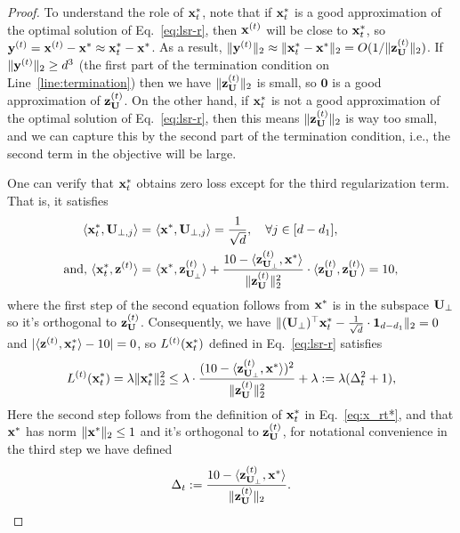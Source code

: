 \begin{proof}
To understand the role of $\mathbf{x}_t^{*}$, note that if $\mathbf{x}^{*}_{t}$ is a good approximation of the optimal solution of Eq.~\eqref{eq:lsr-r}, then $\mathbf{x}^{{(t)}}$ will be close to $\mathbf{x}^{*}_{t}$, so $\mathbf{y}^{(t)} = \mathbf{x}^{{(t)}} - \mathbf{x}^{*} \approx \mathbf{x}^{*}_{t} - \mathbf{x}^{*}$. As a result, $\|\mathbf{y}^{(t)}\|_2 \approx \|\mathbf{x}^{*}_{t} - \mathbf{x}^{*}\|_2 = O(1/\|\mathbf{z}_{\mathbf{U}}^{(t)}\|_2)$. If $\|\mathbf{y}^{(t)}\|_2 \geq d^3$ (the first part of the termination condition on Line~\ref{line:termination}) then we have $\|\mathbf{z}_{\mathbf{U}}^{(t)}\|_2$ is small, so $\mathbf{0}$ is a good approximation of $\mathbf{z}^{{(t)}}_{\mathbf{U}}$. 
On the other hand, if $\mathbf{x}^{*}_{t}$ is not a good approximation of the optimal solution of Eq.~\eqref{eq:lsr-r}, then this means $\|\mathbf{z}_{\mathbf{U}}^{(t)}\|_2$ is way too small, and we can capture this by the second part of the termination condition, i.e., the second term in the objective will be large.

One can verify that $\mathbf{x}^{*}_{t}$ obtains zero loss except for the third regularization term. That is, it satisfies 
\begin{align*}
\langle \mathbf{x}^{*}_{t}, \mathbf{U}_{\perp, j}\rangle = &~ \langle \mathbf{x}^{*}, \mathbf{U}_{\perp,j}\rangle = \frac{1}{\sqrt{d}}, \quad \forall j \in [d-d_1], \\
\text{and, } \langle \mathbf{x}^{*}_{t}, \mathbf{z}^{(t)}\rangle = &~\langle \mathbf{x}^{*}, \mathbf{z}_{\mathbf{U}_\perp}^{(t)} \rangle + \frac{10 - \langle \mathbf{z}_{\mathbf{U}_\perp}^{(t)},\mathbf{x}^{*}\rangle}{\|\mathbf{z}_{\mathbf{U}}^{(t)}\|_2^2}\cdot \langle \mathbf{z}_{\mathbf{U}}^{(t)}, \mathbf{z}_{\mathbf{U}}^{(t)}\rangle = 10,
\end{align*}
where the first step of the second equation follows from $\mathbf{x}^*$ is in the subspace $\mathbf{U}_\perp$ so it's orthogonal to $\mathbf{z}_{\mathbf{U}}^{(t)}$.
Consequently, we have $\|(\mathbf{U}_\perp)^{\top}\mathbf{x}_{t}^{*} - \frac{1}{\sqrt{d}} \cdot \mathbf{1}_{d-d_1}\|_2 = 0$ and $|\langle \mathbf{z}^{(t)}, \mathbf{x}_{t}^{*}\rangle - 10| = 0$, so $L^{(t)}(\mathbf{x}_{t}^{*})$ defined in Eq.~\eqref{eq:lsr-r} satisfies
\begin{align}
L^{(t)}(\mathbf{x}_{t}^{*}) = \lambda\|\mathbf{x}_{t}^{*}\|_2^2 
\leq \lambda \cdot \frac{(10 - \langle \mathbf{z}_{\mathbf{U}_\perp}^{(t)},\mathbf{x}^{*}\rangle)^2}{\|\mathbf{z}_{\mathbf{U}}^{(t)}\|_2^2} + \lambda := \lambda (\Delta_{t}^2 + 1),
\label{eq:loss}
\end{align}
Here the second step follows from the definition of $\mathbf{x}_{t}^{*}$ in Eq.~\eqref{eq:x_rt*}, and that $\mathbf{x}^*$ has norm $\|\mathbf{x}^*\|_2 \leq 1$ and it's orthogonal to $\mathbf{z}_{\mathbf{U}}^{(t)}$, for notational convenience in the third step we have defined
\begin{equation}\label{eq:def_Delta_rt}
\Delta_{t} := \frac{10 - \langle \mathbf{z}_{\mathbf{U}_\perp}^{(t)}, \mathbf{x}^{*}\rangle}{\|\mathbf{z}_{\mathbf{U}}^{(t)}\|_2}.
\end{equation}



\end{proof}
